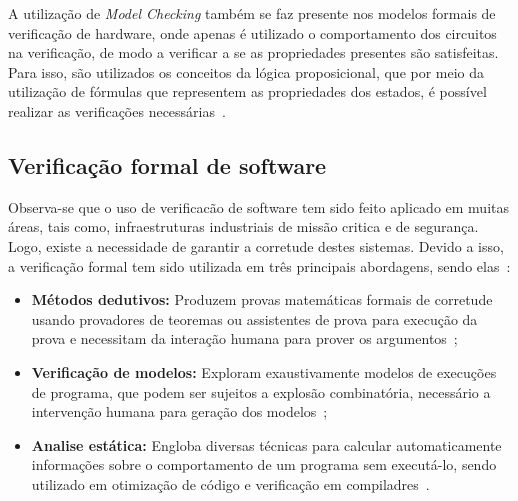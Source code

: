 
\par
A utilização de \textit{Model Checking} também se faz presente nos modelos formais de verificação de hardware, onde apenas é utilizado o comportamento dos circuitos na verificação, de modo a verificar a se as propriedades  presentes são satisfeitas. Para isso, são utilizados os conceitos da lógica proposicional, que por meio da utilização de fórmulas que representem as propriedades dos estados, é possível realizar as verificações necessárias~\cite{seger1992introduction}.

 
\subsection{Verificação formal de software}

Observa-se que o uso de verificacão de software tem sido feito aplicado em muitas áreas, tais como, infraestruturas industriais de missão critica e de segurança.  Logo, existe a necessidade de garantir a corretude destes sistemas. Devido a isso, a verificação formal tem sido utilizada em três principais abordagens, sendo elas~\cite{cousot2010gentle,d2008survey}:


\begin{itemize}
 \item \textbf{Métodos dedutivos:} Produzem provas matemáticas formais de corretude usando provadores de teoremas ou assistentes de prova para execução da prova e necessitam da interação humana para prover os argumentos~\cite{cousot2010gentle};
  \item \textbf{Verificação de modelos:} Exploram exaustivamente modelos de execuções de programa, que podem ser sujeitos a explosão combinatória, necessário a intervenção humana para geração dos modelos~\cite{rocha2015verificaccao};
  \item \textbf{Analise estática:} Engloba diversas técnicas para calcular automaticamente informações sobre o comportamento de um programa sem executá-lo, sendo utilizado em otimização de código e verificação em compiladres~\cite{d2008survey}.
\end{itemize}

